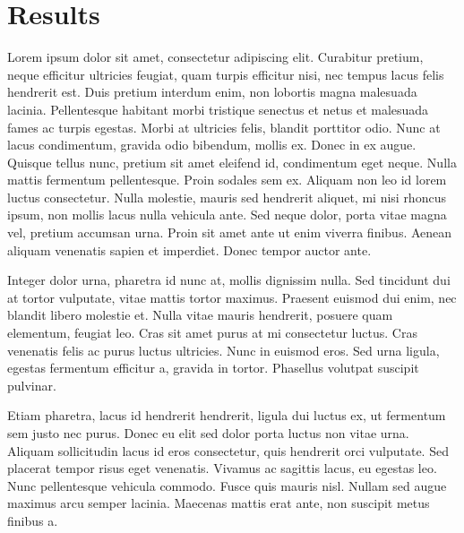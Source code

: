 \section{Results}
Lorem ipsum dolor sit amet, consectetur adipiscing elit. Curabitur pretium, neque efficitur ultricies feugiat, quam turpis efficitur nisi, nec tempus lacus felis hendrerit est. Duis pretium interdum enim, non lobortis magna malesuada lacinia. Pellentesque habitant morbi tristique senectus et netus et malesuada fames ac turpis egestas. Morbi at ultricies felis, blandit porttitor odio. Nunc at lacus condimentum, gravida odio bibendum, mollis ex. Donec in ex augue. Quisque tellus nunc, pretium sit amet eleifend id, condimentum eget neque. Nulla mattis fermentum pellentesque. Proin sodales sem ex. Aliquam non leo id lorem luctus consectetur. Nulla molestie, mauris sed hendrerit aliquet, mi nisi rhoncus ipsum, non mollis lacus nulla vehicula ante. Sed neque dolor, porta vitae magna vel, pretium accumsan urna. Proin sit amet ante ut enim viverra finibus. Aenean aliquam venenatis sapien et imperdiet. Donec tempor auctor ante.

Integer dolor urna, pharetra id nunc at, mollis dignissim nulla. Sed tincidunt dui at tortor vulputate, vitae mattis tortor maximus. Praesent euismod dui enim, nec blandit libero molestie et. Nulla vitae mauris hendrerit, posuere quam elementum, feugiat leo. Cras sit amet purus at mi consectetur luctus. Cras venenatis felis ac purus luctus ultricies. Nunc in euismod eros. Sed urna ligula, egestas fermentum efficitur a, gravida in tortor. Phasellus volutpat suscipit pulvinar.

Etiam pharetra, lacus id hendrerit hendrerit, ligula dui luctus ex, ut fermentum sem justo nec purus. Donec eu elit sed dolor porta luctus non vitae urna. Aliquam sollicitudin lacus id eros consectetur, quis hendrerit orci vulputate. Sed placerat tempor risus eget venenatis. Vivamus ac sagittis lacus, eu egestas leo. Nunc pellentesque vehicula commodo. Fusce quis mauris nisl. Nullam sed augue maximus arcu semper lacinia. Maecenas mattis erat ante, non suscipit metus finibus a. 